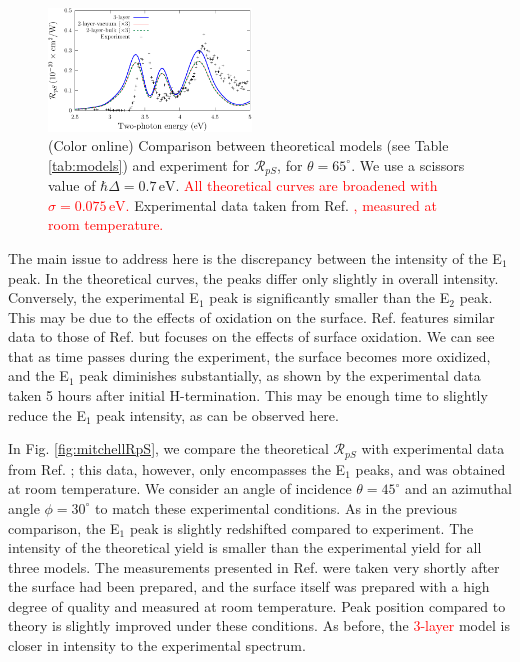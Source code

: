 \documentclass[prb,superscriptaddress,showpacs,twocolumn,letterpaper]{revtex4}
\newcommand{\correction}[1]{\textcolor{red}{#1}}
\begin{document}
\begin{figure}[b]
\centering
\includegraphics[width=0.48\textwidth]{fig3}
\caption{(Color online) Comparison between theoretical models (see Table
\ref{tab:models}) and experiment for $\mathcal{R}_{pS}$, for
$\theta=65^{\circ}$. We use a scissors value of $\hbar\Delta = 0.7\,\text{eV}$.
\correction{All theoretical curves are broadened with $\sigma=0.075\,\text{eV}$.
} %
Experimental data taken from Ref.
\correction{, measured at room temperature.} %
\label{fig:RpS}}
\end{figure}

The main issue to address here is the discrepancy between the intensity of the
E$_{1}$ peak. In the theoretical curves, the peaks differ only slightly in
overall intensity. Conversely, the experimental E$_{1}$ peak is significantly
smaller than the E$_{2}$ peak. This may be due to the effects of oxidation on
the surface. Ref.  features similar data to those of
Ref.  but focuses on the effects of surface oxidation. We
can see that as time passes during the experiment, the surface becomes more
oxidized, and the E$_{1}$ peak diminishes substantially, as shown by the
experimental data taken 5 hours after initial H-termination. This may be enough
time to slightly reduce the E$_{1}$ peak intensity, as can be observed here.

In Fig. \ref{fig:mitchellRpS}, we compare the theoretical $\mathcal{R}_{pS}$
with experimental data from Ref. ; this data, however,
only encompasses the E$_{1}$ peaks, and was obtained at room temperature. We
consider an angle of incidence $\theta=45^\circ$ and an azimuthal angle
$\phi=30^\circ$ to match these experimental conditions. As in the previous
comparison, the E$_{1}$ peak is slightly redshifted compared to experiment. The
intensity of the theoretical yield is smaller than the experimental yield for
all three models. The measurements presented in Ref. 
were taken very shortly after the surface had been prepared, and the surface
itself was prepared with a high degree of quality and measured at room
temperature. Peak position compared to theory is slightly improved under these
conditions. As before, the \correction{3-layer} model is closer in intensity to
the experimental spectrum.
\end{document}
